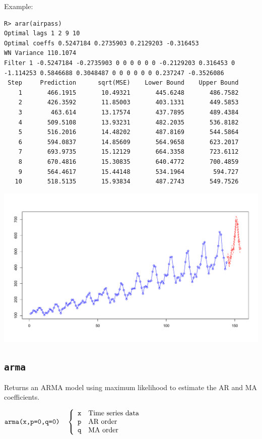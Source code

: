 \documentclass[12pt]{article}
\begin{document}
\noindent
Example:

\begin{verbatim}
R> arar(airpass)
Optimal lags 1 2 9 10 
Optimal coeffs 0.5247184 0.2735903 0.2129203 -0.316453 
WN Variance 110.1074 
Filter 1 -0.5247184 -0.2735903 0 0 0 0 0 0 -0.2129203 0.316453 0
-1.114253 0.5846688 0.3048487 0 0 0 0 0 0 0.237247 -0.3526086 
 Step     Prediction      sqrt(MSE)    Lower Bound    Upper Bound
    1       466.1915       10.49321       445.6248       486.7582
    2       426.3592       11.85003       403.1331       449.5853
    3        463.614       13.17574       437.7895       489.4384
    4       509.5108       13.93231       482.2035       536.8182
    5       516.2016       14.48202       487.8169       544.5864
    6       594.0837       14.85609       564.9658       623.2017
    7       693.9735       15.12129       664.3358       723.6112
    8       670.4816       15.30835       640.4772       700.4859
    9       564.4617       15.44148       534.1964        594.727
   10       518.5135       15.93834       487.2743       549.7526
\end{verbatim}

\begin{center}
\includegraphics[scale=0.3]{Rplot-4.pdf}
\end{center}

\newpage

\subsection{\tt arma}
Returns an ARMA model using maximum likelihood
to estimate the AR and MA coefficients.

\bigskip
$
\hbox{\tt arma(x,p=0,q=0)}\quad\left\{\begin{array}{ll}
{\tt x} & \hbox{Time series data}\\
{\tt p} & \hbox{AR order}\\
{\tt q} & \hbox{MA order}
\end{array}\right.
$
\end{document}
